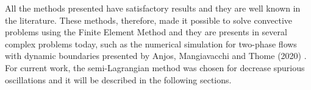 \medskip
All the methods presented have satisfactory results and
they are well known in the literature.
 These methods, therefore, made it possible to solve
 convective problems using the Finite Element Method
and they are presents in several complex problems today, 
such as the numerical simulation for two-phase flows with
dynamic boundaries presented
 by Anjos, Mangiavacchi and Thome (2020) \cite{anjos2020}.
 For current work, the semi-Lagrangian method was chosen for
 decrease spurious oscillations and it will be described 
in the following sections.


